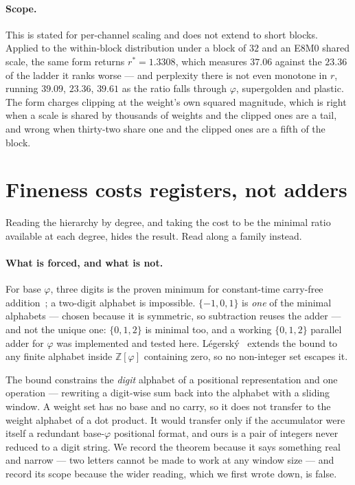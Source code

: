 \documentclass[11pt]{article}
\theoremstyle{definition}
\begin{document}
\paragraph{Scope.} This is stated for per-channel scaling and does not extend to
short blocks. Applied to the within-block distribution under a block of $32$ and
an E8M0 shared scale, the same form returns $r^{*}=1.3308$, which measures
$37.06$ against the $23.36$ of the ladder it ranks worse --- and perplexity
there is not even monotone in $r$, running $39.09$, $23.36$, $39.61$ as the
ratio falls through $\varphi$, supergolden and plastic. The form charges
clipping at the weight's own squared magnitude, which is right when a scale is
shared by thousands of weights and the clipped ones are a tail, and wrong when
thirty-two share one and the clipped ones are a fifth of the block.

\section{Fineness costs registers, not adders}\label{sec:oneadder}

Reading the hierarchy by degree, and taking the cost to be the minimal ratio
available at each degree, hides the result. Read along a family instead.

\paragraph{What is forced, and what is not.} For base $\varphi$, three digits is
the proven minimum for constant-time carry-free addition~\cite{frougny2011,
frougny2013}; a two-digit alphabet is impossible. $\{-1,0,1\}$ is \emph{one} of
the minimal alphabets --- chosen because it is symmetric, so subtraction reuses
the adder --- and not the unique one: $\{0,1,2\}$ is minimal too, and a working
$\{0,1,2\}$ parallel adder for $\varphi$ was implemented and tested here.
L\'egersk\'y~\cite{legersky2018} extends the bound to any finite alphabet inside
$\mathbb{Z}[\varphi]$ containing zero, so no non-integer set escapes it.

The bound constrains the \emph{digit} alphabet of a positional representation
and one operation --- rewriting a digit-wise sum back into the alphabet with a
sliding window. A weight set has no base and no carry, so it does not transfer
to the weight alphabet of a dot product. It would transfer only if the
accumulator were itself a redundant base-$\varphi$ positional format, and ours
is a pair of integers never reduced to a digit string. We record the theorem
because it says something real and narrow --- two letters cannot be made to work
at any window size --- and record its scope because the wider reading, which we
first wrote down, is false.
\end{document}
